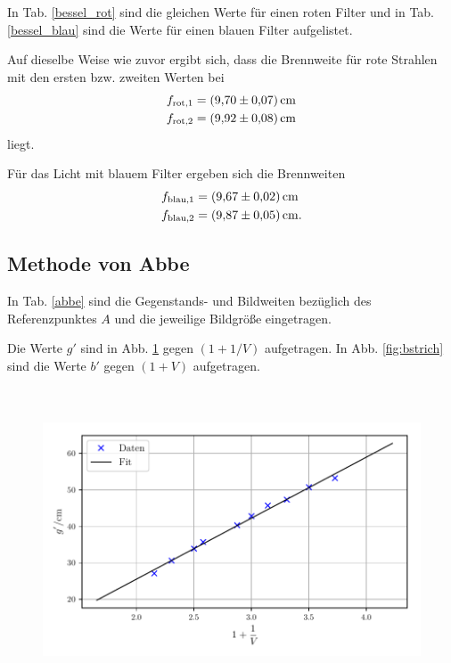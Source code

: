 \noindent In Tab. \ref{bessel_rot} sind die gleichen Werte für einen roten Filter und in Tab. \ref{bessel_blau} sind die Werte für einen blauen Filter aufgelistet.




\noindent Auf dieselbe Weise wie zuvor ergibt sich, dass die Brennweite für rote Strahlen mit den ersten bzw. zweiten Werten bei 
\begin{align*}
    f_\text{rot,1} &= \SI{9.70 \pm 0.07}{\centi\meter} \\
    f_\text{rot,2} &= \SI{9.92 \pm 0.08}{\centi\meter}
\end{align*}
liegt.

\noindent Für das Licht mit blauem Filter ergeben sich die Brennweiten
\begin{align*}
    f_\text{blau,1} &= \SI{9.67 \pm 0.02}{\centi\meter} \\
    f_\text{blau,2} &= \SI{9.87 \pm 0.05}{\centi\meter}.
\end{align*}



\subsection{Methode von Abbe}
In Tab. \ref{abbe} sind die Gegenstands- und Bildweiten bezüglich des Referenzpunktes $A$ und die jeweilige Bildgröße eingetragen.



\noindent Die Werte $g'$ sind in Abb. \ref{fig:gstrich} gegen $(1+1/V)$ aufgetragen. In Abb. \ref{fig:bstrich} sind die Werte $b'$ gegen $(1+V)$ aufgetragen.

\begin{figure}
    \centering
    \includegraphics[width=14cm, height=9cm]{build/abbe_g.pdf}
    \caption{}
    \label{fig:gstrich}
\end{figure}

